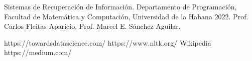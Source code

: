 \documentclass[runningheads,a4paper]{llncs}
\begin{document}
\begin{thebibliography}{4}
	
	 Sistemas de Recuperación de Información. Departamento de Programación, Facultad de Matemática y Computación, Universidad de la Habana 2022. Prof. Carlos Fleitas Aparicio, Prof. Marcel E. Sánchez Aguilar.

	 https://towardsdatascience.com/
	 https://www.nltk.org/
	 Wikipedia 
	 https://medium.com/
	
\end{thebibliography}
\end{document}
